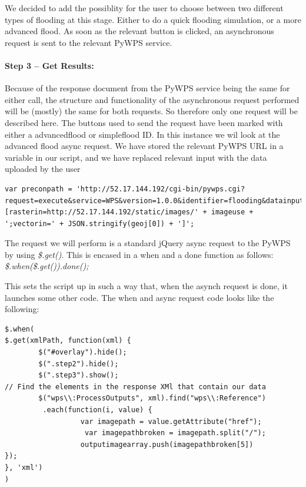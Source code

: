 We decided to add the possiblity for the user to choose between two different types of flooding at this stage. Either to do a quick flooding simulation, or a more advanced flood.
As soon as the relevant button is clicked, an asynchronous request is sent to the relevant PyWPS service.\\

\paragraph{Step 3 – Get Results:}
Because of the response document from the PyWPS service being the same for either call, the structure and functionality of the asynchronous request performed will be (mostly) the same for both requests. So therefore only one request will be described here. 
The buttons used to send the request have been marked with either a advancedflood or simpleflood ID. In this instance we wil look at the advanced flood async request.
We have stored the relevant PyWPS URL in a variable in our script, and we have replaced relevant input with the data uploaded by the user 

\begin{lstlisting}
var preconpath = 'http://52.17.144.192/cgi-bin/pywps.cgi?request=execute&service=WPS&version=1.0.0&identifier=flooding&datainputs=[rasterin=http://52.17.144.192/static/images/' + imageuse + ';vectorin=' + JSON.stringify(geoj[0]) + ']';
\end{lstlisting}

The request we will perform is a standard jQuery async request to the PyWPS by using \textit{\$.get()}. This is encased in a when and a done function as follows: \textit{\$.when(\$.get()).done();}

This sets the script up in such a way that, when the asynch request is done, it launches some other code. 
The when and async request code looks like the following:

\begin{lstlisting}
$.when(
$.get(xmlPath, function(xml) {
        $("#overlay").hide();
        $(".step2").hide();
        $(".step3").show();
// Find the elements in the response XMl that contain our data
        $("wps\\:ProcessOutputs", xml).find("wps\\:Reference")
         .each(function(i, value) {
                  var imagepath = value.getAttribute("href");
                   var imagepathbroken = imagepath.split("/");
                  outputimagearray.push(imagepathbroken[5])
});
}, 'xml')
)
\end{lstlisting}

